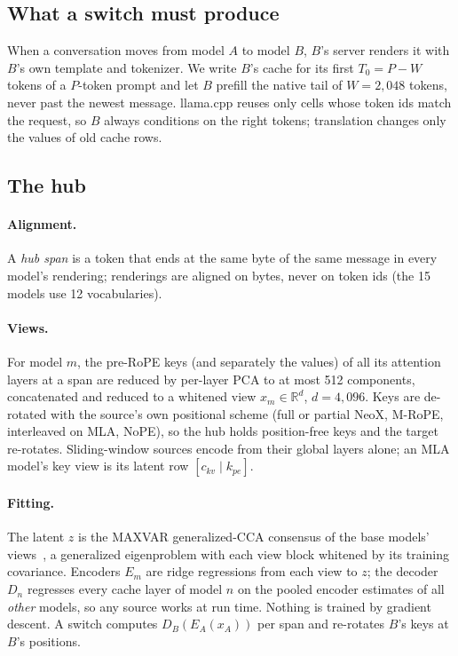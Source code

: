 \documentclass[11pt]{article}
\begin{document}
\subsection{What a switch must produce}
When a conversation moves from model $A$ to model $B$, $B$'s server renders it with $B$'s own template and
tokenizer. We write $B$'s cache for its first $T_0 = P - W$ tokens of a $P$-token prompt and let $B$ prefill
the native tail of $W = 2{,}048$ tokens, never past the newest message. llama.cpp reuses only cells whose
token ids match the request, so $B$ always conditions on the right tokens; translation changes only the
values of old cache rows.

\subsection{The hub}\label{sec:hub}
\paragraph{Alignment.} A \emph{hub span} is a token that ends at the same byte of the same message in every
model's rendering; renderings are aligned on bytes, never on token ids (the 15 models use 12 vocabularies).

\paragraph{Views.} For model $m$, the pre-RoPE keys (and separately the values) of all its attention layers
at a span are reduced by per-layer PCA to at most 512 components, concatenated and reduced to a whitened view
$x_m \in \mathbb{R}^{d}$, $d = 4{,}096$. Keys are de-rotated with the source's own positional scheme (full or
partial NeoX, M-RoPE, interleaved on MLA, NoPE), so the hub holds position-free keys and the target
re-rotates. Sliding-window sources encode from their global layers alone; an MLA model's key view is its
latent row $[c_{kv} \mid k_{pe}]$.

\paragraph{Fitting.} The latent $z$ is the MAXVAR generalized-CCA consensus of the base models'
views~\citep{kettenring1971gcca}, a generalized eigenproblem with each view block whitened by its training
covariance. Encoders $E_m$ are ridge regressions from each view to $z$; the decoder $D_n$ regresses every
cache layer of model $n$ on the pooled encoder estimates of all \emph{other} models, so any source works at
run time. Nothing is trained by gradient descent. A switch computes $D_B(E_A(x_A))$ per span and re-rotates
$B$'s keys at $B$'s positions.
\end{document}
